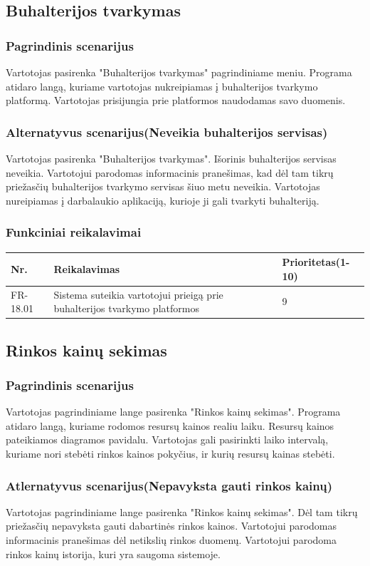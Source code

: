 \documentclass[oneside]{VUMIFPSkursinis}
\begin{document}
\subsection{Buhalterijos tvarkymas}
	\subsubsection{Pagrindinis scenarijus}
	Vartotojas pasirenka "Buhalterijos tvarkymas" pagrindiniame meniu. Programa atidaro langą, kuriame vartotojas nukreipiamas į buhalterijos tvarkymo platformą. Vartotojas prisijungia prie platformos naudodamas savo duomenis.
	\subsubsection{Alternatyvus scenarijus(Neveikia buhalterijos servisas)}
	Vartotojas pasirenka "Buhalterijos tvarkymas". Išorinis buhalterijos servisas neveikia. Vartotojui parodomas informacinis pranešimas, kad dėl tam tikrų priežasčių buhalterijos tvarkymo servisas šiuo metu neveikia. Vartotojas nureipiamas į darbalaukio aplikaciją, kurioje ji gali tvarkyti buhalteriją.
	\subsubsection{Funkciniai reikalavimai}
	\begin{table}[htbp]
	\begin{tabularx}{1\textwidth}{ |P{2.5cm}|X|P{3cm }| }  \hline
		Nr. & Reikalavimas & Prioritetas(1-10) \\ \hline
		FR-18.01 & Sistema suteikia vartotojui prieigą prie buhalterijos tvarkymo platformos & 9 \\ \hline
	\end{tabularx}
\end{table}
\subsection{Rinkos kainų sekimas}
	\subsubsection{Pagrindinis scenarijus}
	Vartotojas pagrindiniame lange pasirenka "Rinkos kainų sekimas". Programa atidaro langą, kuriame rodomos resursų kainos realiu laiku. Resursų kainos pateikiamos diagramos pavidalu. Vartotojas gali pasirinkti laiko intervalą, kuriame nori stebėti rinkos kainos pokyčius, ir kurių resursų kainas stebėti.
	\subsubsection{Atlernatyvus scenarijus(Nepavyksta gauti rinkos kainų)}
	Vartotojas pagrindiniame lange pasirenka "Rinkos kainų sekimas". Dėl tam tikrų priežasčių nepavyksta gauti dabartinės rinkos kainos. Vartotojui parodomas informacinis pranešimas dėl netikslių rinkos duomenų. Vartotojui parodoma rinkos kainų istorija, kuri yra saugoma sistemoje.
\end{document}
